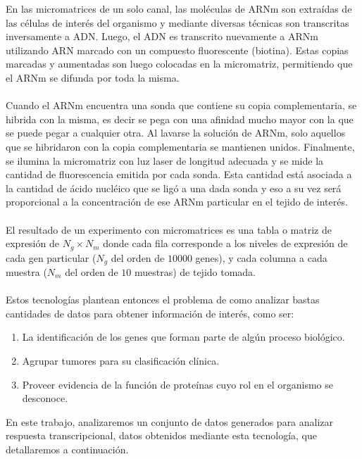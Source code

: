 En las micromatrices de un solo canal, las moléculas de ARNm son extraídas de las células de interés del organismo y mediante diversas técnicas son transcritas inversamente a ADN. Luego, el ADN es transcrito nuevamente a ARNm utilizando ARN marcado con un compuesto fluorescente (biotina). Estas copias marcadas y aumentadas son luego colocadas en la micromatriz, permitiendo que el ARNm se difunda por toda la misma.\\\\
Cuando el ARNm encuentra una sonda que contiene su copia complementaria, se hibrida con la misma, es decir se pega con una afinidad mucho mayor con la que se puede pegar a cualquier otra. Al lavarse la solución de ARNm, solo aquellos que se hibridaron con la copia complementaria se mantienen unidos. Finalmente, se ilumina la micromatriz con luz laser de longitud adecuada y se mide la cantidad de fluorescencia emitida por cada sonda. Esta cantidad está asociada a la cantidad de ácido nucléico que se ligó a una dada sonda y eso a su vez será proporcional a la concentración de ese ARNm particular en el tejido de interés.\\\\
El resultado de un experimento con micromatrices es una tabla o matriz de expresión de $N_g \times N_m$ donde cada fila corresponde a los niveles de expresión de cada gen particular ($N_g$ del orden de $10000$ genes), y cada columna a cada muestra ($N_m$ del orden de $10$ muestras) de tejido tomada.\\\\
Estos tecnologías plantean entonces el problema de como analizar bastas cantidades de datos para obtener información de interés, como ser:
\begin{enumerate}
	\item La identificación de los genes que forman parte de algún proceso biológico.
	\item Agrupar tumores para su clasificación clínica.
	\item Proveer evidencia de la función de proteínas cuyo rol en el organismo se desconoce.
\end{enumerate}
En este trabajo, analizaremos un conjunto de datos generados para analizar respuesta transcripcional, datos obtenidos mediante esta tecnología, que detallaremos a continuación.\cite{Babu2004,Schulze2001,Domany2003}
